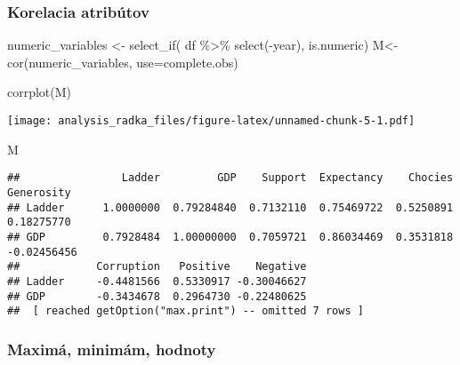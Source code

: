 \documentclass[
]{article}
\newenvironment{Shaded}{\begin{snugshade}}{\end{snugshade}}
\newcommand{\AttributeTok}[1]{\textcolor[rgb]{0.77,0.63,0.00}{#1}}
\newcommand{\FunctionTok}[1]{\textcolor[rgb]{0.00,0.00,0.00}{#1}}
\newcommand{\NormalTok}[1]{#1}
\newcommand{\OtherTok}[1]{\textcolor[rgb]{0.56,0.35,0.01}{#1}}
\newcommand{\SpecialCharTok}[1]{\textcolor[rgb]{0.00,0.00,0.00}{#1}}
\newcommand{\StringTok}[1]{\textcolor[rgb]{0.31,0.60,0.02}{#1}}
\begin{document}
\hypertarget{korelacia-atribuxfatov}{%
\subsubsection{Korelacia atribútov}\label{korelacia-atribuxfatov}}

\begin{Shaded}
\begin{Highlighting}[]
\NormalTok{numeric\_variables }\OtherTok{\textless{}{-}} \FunctionTok{select\_if}\NormalTok{( df }\SpecialCharTok{\%\textgreater{}\%} \FunctionTok{select}\NormalTok{(}\SpecialCharTok{{-}}\NormalTok{year), is.numeric)}
\NormalTok{M}\OtherTok{\textless{}{-}}\FunctionTok{cor}\NormalTok{(numeric\_variables, }\AttributeTok{use=}\StringTok{\textquotesingle{}complete.obs\textquotesingle{}}\NormalTok{)}

\FunctionTok{corrplot}\NormalTok{(M)}
\end{Highlighting}
\end{Shaded}

\texttt{[image: analysis\_radka\_files/figure-latex/unnamed-chunk-5-1.pdf]}

\begin{Shaded}
\begin{Highlighting}[]
\NormalTok{M}
\end{Highlighting}
\end{Shaded}

\begin{verbatim}
##                Ladder         GDP    Support  Expectancy    Chocies  Generosity
## Ladder      1.0000000  0.79284840  0.7132110  0.75469722  0.5250891  0.18275770
## GDP         0.7928484  1.00000000  0.7059721  0.86034469  0.3531818 -0.02456456
##            Corruption   Positive    Negative
## Ladder     -0.4481566  0.5330917 -0.30046627
## GDP        -0.3434678  0.2964730 -0.22480625
##  [ reached getOption("max.print") -- omitted 7 rows ]
\end{verbatim}

\hypertarget{maximuxe1-minimuxe1m-hodnoty}{%
\subsubsection{Maximá, minimám,
hodnoty}\label{maximuxe1-minimuxe1m-hodnoty}}
\end{document}
